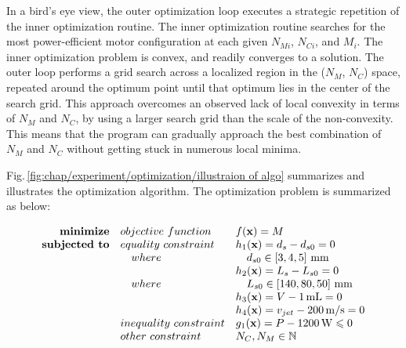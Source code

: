     
    In a bird's eye view, the outer optimization loop executes a strategic repetition of the inner optimization routine. The inner optimization routine searches for the most power-efficient motor configuration at each given $N_{Mi}$, $N_{Ci}$, and $M_i$. The inner optimization problem is convex, and readily converges to a solution. The outer loop performs a grid search across a localized region in the ($N_M$, $N_C$) space, repeated around the optimum point until that optimum lies in the center of the search grid. This approach overcomes an observed lack of local convexity in terms of $N_M$ and $N_C$, by using a larger search grid than the scale of the non-convexity. This means that the program can gradually approach the best combination of $N_M$ and $N_C$ without getting stuck in numerous local minima. 
    
    
    Fig.\,\ref{fig:chap/experiment/optimization/illustraion of algo} summarizes and illustrates the optimization algorithm. The optimization problem is summarized as below:
    
    
    \begin{equation}
        \begin{array}{rll}
            \textbf{minimize}       & \small{objective\,\,function}     & f(\textbf{x})=M \\
            \textbf{subjected to}   & \small{equality\,\,constraint}    & h_1(\textbf{x})=d_s - d_{s0}= 0\\
                                    &\quad \small{where}                &\quad  d_{s0}\in\left[3,4,5\right]\,\mathrm{mm}\\
                                    &                                   & h_2(\textbf{x})=L_s - L_{s0} = 0\\
                                    &\quad \small{where}                &\quad  L_{s0}\in\left[140,80,50\right]\,\mathrm{mm}\\
                                    &                                   & h_3(\textbf{x})=V - 1\,\mathrm{mL} = 0\\
                                    &                                   & h_4(\textbf{x})=v_{jet} - 200\,\mathrm{m/s}=0\\
                                    & \small{inequality\,\,constraint}  & g_1(\textbf{x})=P - 1200\,\mathrm{W} \leqslant 0\\
                                            & \small{other\,\,constraint}       & N_C, N_M \in 	\mathbb{N} \\ \\
                \end{array}
                \label{eq:outer optimization for PMLSMs 2}
            \end{equation}    

